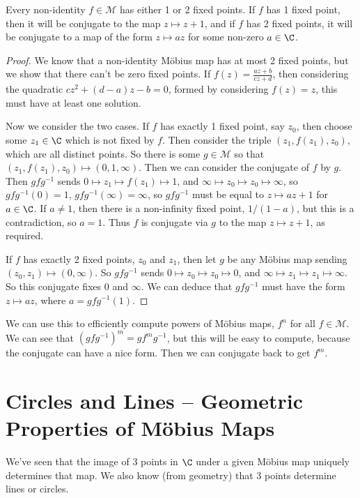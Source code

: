 \documentclass[a4]{scrreprt}
\newcommand{\newsection}{\section}
\begin{document}
\begin{theorem}
	Every non-identity $f \in \mathcal{M}$ has either 1 or 2 fixed points. If $f$ has 1 fixed point, then it will be conjugate to the map $z \mapsto z + 1$, and if $f$ has 2 fixed points, it will be conjugate to a map of the form $z \mapsto az$ for some non-zero $a \in \C$.
\end{theorem}
\begin{proof}
	We know that a non-identity Möbius map has at most 2 fixed points, but we show that there can't be zero fixed points. If $f(z) = \frac{az + b}{cz + d}$, then considering the quadratic $cz^2 + (d - a)z - b = 0$, formed by considering $f(z) = z$, this must have at least one solution.

	Now we consider the two cases. If $f$ has exactly 1 fixed point, say $z_0$, then choose some $z_1 \in \C$ which is not fixed by $f$. Then consider the triple $(z_1, f(z_1), z_0)$, which are all distinct points.  So there is some $g \in \mathcal{M}$ so that $(z_1, f(z_1), z_0) \mapsto (0, 1, \infty)$.
	Then we can consider the conjugate of $f$ by $g$. Then $gfg^{-1}$ sends $0 \mapsto z_1 \mapsto f(z_1) \mapsto 1$, and $\infty \mapsto z_0 \mapsto z_0 \mapsto \infty$, so $gfg^{-1}(0) = 1$, $gfg^{-1}(\infty) = \infty$, so $gfg^{-1}$ must be equal to $z \mapsto az + 1$ for $a \in \C$. If $a \neq 1$, then there is a non-infinity fixed point, $1/(1 - a)$, but this is a contradiction, so $a = 1$. Thus $f$ is conjugate via $g$ to the map $z \mapsto z + 1$, as required.

	If $f$ has exactly 2 fixed points, $z_0$ and $z_1$, then let $g$ be any Möbius map sending $(z_0, z_1) \mapsto (0, \infty)$. So $gfg^{-1}$ sends $0 \mapsto z_0 \mapsto z_0 \mapsto 0$, and $\infty \mapsto z_1 \mapsto z_1 \mapsto \infty$. So this conjugate fixes $0$ and $\infty$. We can deduce that $gfg^{-1}$ must have the form $z \mapsto az$, where $a = gfg^{-1}(1)$.
\end{proof}

We can use this to efficiently compute powers of Möbius maps, $f^n$ for all $f \in \mathcal{M}$. 
We can see that $(gfg^{-1})^m = gf^m g^{-1}$, but this will be easy to compute, because the conjugate can have a nice form. Then we can conjugate back to get $f^m$.


\newsection{Circles and Lines -- Geometric Properties of Möbius Maps}

We've seen that the image of 3 points in $\C$ under a given Möbius map uniquely determines that map. We also know (from geometry) that 3 points determine lines or circles. 
\end{document}
